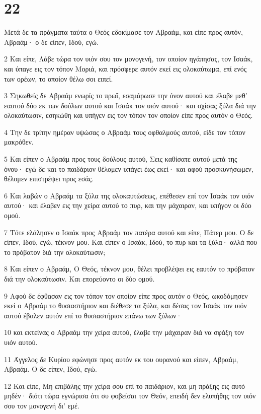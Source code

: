 \chapter{22}

\par Μετά δε τα πράγματα ταύτα ο Θεός εδοκίμασε τον Αβραάμ, και είπε προς αυτόν, Αβραάμ· ο δε είπεν, Ιδού, εγώ.
\par 2 Και είπε, Λάβε τώρα τον υιόν σου τον μονογενή, τον οποίον ηγάπησας, τον Ισαάκ, και ύπαγε εις τον τόπον Μοριά, και πρόσφερε αυτόν εκεί εις ολοκαύτωμα, επί ενός των ορέων, το οποίον θέλω σοι ειπεί.
\par 3 Σηκωθείς δε Αβραάμ ενωρίς το πρωΐ, εσαμάρωσε την όνον αυτού και έλαβε μεθ' εαυτού δύο εκ των δούλων αυτού και Ισαάκ τον υιόν αυτού· και σχίσας ξύλα διά την ολοκαύτωσιν, εσηκώθη και υπήγεν εις τον τόπον τον οποίον είπε προς αυτόν ο Θεός.
\par 4 Την δε τρίτην ημέραν υψώσας ο Αβραάμ τους οφθαλμούς αυτού, είδε τον τόπον μακρόθεν.
\par 5 Και είπεν ο Αβραάμ προς τους δούλους αυτού, Σεις καθίσατε αυτού μετά της όνου· εγώ δε και το παιδάριον θέλομεν υπάγει έως εκεί· και αφού προσκυνήσωμεν, θέλομεν επιστρέψει προς εσάς.
\par 6 Και λαβών ο Αβραάμ τα ξύλα της ολοκαυτώσεως, επέθεσεν επί τον Ισαάκ τον υιόν αυτού· και έλαβεν εις την χείρα αυτού το πυρ, και την μάχαιραν, και υπήγον οι δύο ομού.
\par 7 Τότε ελάλησεν ο Ισαάκ προς Αβραάμ τον πατέρα αυτού και είπε, Πάτερ μου. Ο δε είπεν, Ιδού, εγώ, τέκνον μου. Και είπεν ο Ισαάκ, Ιδού, το πυρ και τα ξύλα· αλλά που το πρόβατον διά την ολοκαύτωσιν;
\par 8 Και είπεν ο Αβραάμ, Ο Θεός, τέκνον μου, θέλει προβλέψει εις εαυτόν το πρόβατον διά την ολοκαύτωσιν. Και επορεύοντο οι δύο ομού.
\par 9 Αφού δε έφθασαν εις τον τόπον τον οποίον είπε προς αυτόν ο Θεός, ωκοδόμησεν εκεί ο Αβραάμ το θυσιαστήριον και διέθεσε τα ξύλα, και δέσας τον Ισαάκ τον υιόν αυτού έβαλεν αυτόν επί το θυσιαστήριον επάνω των ξύλων·
\par 10 και εκτείνας ο Αβραάμ την χείρα αυτού, έλαβε την μάχαιραν διά να σφάξη τον υιόν αυτού.
\par 11 Άγγελος δε Κυρίου εφώνησε προς αυτόν εκ του ουρανού και είπεν, Αβραάμ, Αβραάμ. Ο δε είπεν, Ιδού, εγώ.
\par 12 Και είπε, Μη επιβάλης την χείρα σου επί το παιδάριον, και μη πράξης εις αυτό μηδέν· διότι τώρα εγνώρισα ότι συ φοβείσαι τον Θεόν, επειδή δεν ελυπήθης τον υιόν σου τον μονογενή δι' εμέ.
